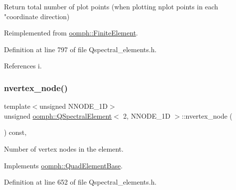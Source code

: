 Return total number of plot points (when plotting nplot points in each "coordinate direction) 



Reimplemented from \hyperlink{classoomph_1_1FiniteElement_a8ed563c7ff0cfd8bafdbb0132b388106}{oomph\+::\+Finite\+Element}.



Definition at line 797 of file Qspectral\+\_\+elements.\+h.



References i.

\mbox{\label{classoomph_1_1QSpectralElement_3_012_00_01NNODE__1D_01_4_ac1ee1aaa26060f0abb87ea27b9ab1fea}} 
\subsubsection{\texorpdfstring{nvertex\+\_\+node()}{nvertex\_node()}}
{\footnotesize\ttfamily template$<$unsigned N\+N\+O\+D\+E\+\_\+1D$>$ \\
unsigned \hyperlink{classoomph_1_1QSpectralElement}{oomph\+::\+Q\+Spectral\+Element}$<$ 2, N\+N\+O\+D\+E\+\_\+1D $>$\+::nvertex\+\_\+node (\begin{DoxyParamCaption}{ }\end{DoxyParamCaption}) const\hspace{0.3cm}{\ttfamily [inline]}, {\ttfamily [virtual]}}



Number of vertex nodes in the element. 



Implements \hyperlink{classoomph_1_1QuadElementBase_a84d28d4fad80333d994d9455596b1ae9}{oomph\+::\+Quad\+Element\+Base}.



Definition at line 652 of file Qspectral\+\_\+elements.\+h.

\mbox{\label{classoomph_1_1QSpectralElement_3_012_00_01NNODE__1D_01_4_a0d1c4c3b40af9d7cbb9922e688bd57ec}} 
